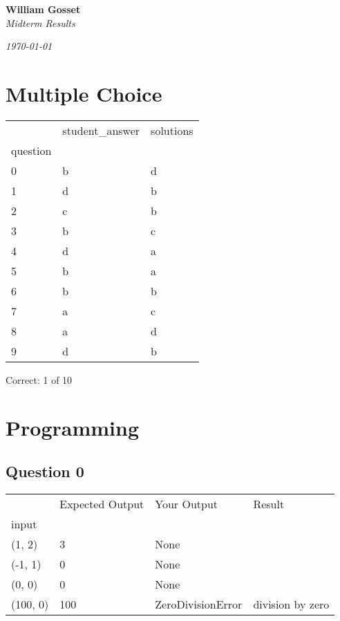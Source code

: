 \documentclass[11pt]{article}
\begin{document}
{}

\begin{center}
\Large{\textbf{William Gosset} \\
\textit{Midterm Results}}
    
\bigskip 

\large\emph{\today}
\end{center}


\section{Multiple Choice}
\begin{tabular}{lll}
\toprule
{} & {student\_answer} & {solutions} \\
{question} & {} & {} \\
\midrule
0 & \cellcolor{red!30} b & d \\
1 & \cellcolor{red!30} d & b \\
2 & \cellcolor{red!30} c & b \\
3 & \cellcolor{red!30} b & c \\
4 & \cellcolor{red!30} d & a \\
5 & \cellcolor{red!30} b & a \\
6 & b & b \\
7 & \cellcolor{red!30} a & c \\
8 & \cellcolor{red!30} a & d \\
9 & \cellcolor{red!30} d & b \\
\bottomrule
\end{tabular}
\smallskip

\noindent Correct: 1 of 10
\section{Programming}
\subsection*{Question 0}
\begin{tabular}{llll}
\toprule
{} & {Expected Output} & {Your Output} & {Result} \\
{input} & {} & {} & {} \\
\midrule
(1, 2) & 3 & None & \cellcolor{red!10} \\
(-1, 1) & 0 & None & \cellcolor{red!10} \\
(0, 0) & 0 & None & \cellcolor{red!10} \\
(100, 0) & 100 & ZeroDivisionError & \cellcolor{red!10}division by zero \\
\bottomrule
\end{tabular}
\end{document}
